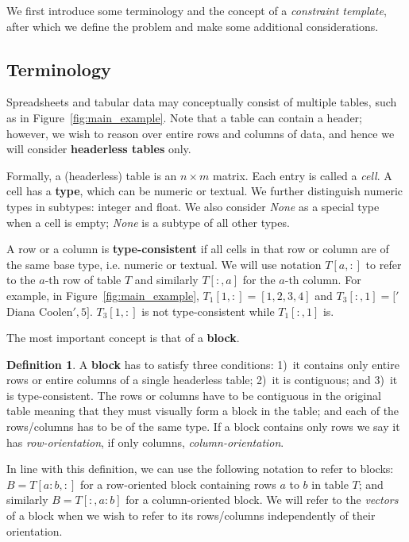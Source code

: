 \documentclass{IEEEtran}
\newcommand{\format}[1]{\textit{#1}\xspace}
\newcommand{\template}{\format{constraint template}}
\newcommand{\rangeto}[2]{#1{:}#2}
\theoremstyle{definition}
\newtheorem{definition}{Definition}
\begin{document}

We first introduce some terminology and the concept of a \template, after which we define the problem and make some additional considerations.

\subsection{Terminology}
Spreadsheets and tabular data may conceptually consist of multiple tables, such as in Figure~\ref{fig:main_example}. Note that a table can contain a header; however, we wish to reason over entire rows and columns of data, and hence we will consider \textbf{headerless tables} only.

Formally, a (headerless) table is an $n \times m$ matrix. Each entry is called a \textit{cell}.
A cell has a {\bf type}, which can be numeric or textual. We further distinguish numeric types in subtypes: integer and float. We also consider \textit{None} as a special type when a cell is empty; \textit{None} is a subtype of all other types.

A row or a column is \textbf{type-consistent} if all cells in that row or column are of the same base type, i.e. numeric or textual.
We will use notation $T[a,{:}]$ to refer to the $a$-th row of table $T$ and similarly $T[{:},a]$ for the $a$-th column.
For example, in Figure~\ref{fig:main_example}, $T_1[1,:] = [1,2,3,4]$ and $T_3[:,1] = ['$Diana Coolen$', 5]$.
$T_3[1, :]$ is not type-consistent while $T_1[:, 1]$ is.

The most important concept is that of a \textbf{block}. 
\begin{definition}
A \textbf{block} has to satisfy three conditions: 1)~it contains only entire rows or entire columns of a single headerless table; 2)~it is contiguous; and 3)~it is type-consistent.
The rows or columns have to be contiguous in the original table meaning that they must visually form a block in the table; and each of the rows/columns has to be of the same type. 
If a block contains only rows we say it has \textit{row-orientation}, if only columns, \textit{column-orientation}. 
\end{definition}

In line with this definition, we can use the following notation to refer to blocks: $B = T[\rangeto{a}{b},:]$ for a row-oriented block containing rows $a$ to $b$ in table $T$; and similarly $B = T[{:},\rangeto{a}{b}]$ for a column-oriented block.
We will refer to the \textit{vectors} of a block when we wish to refer to its rows/columns independently of their orientation.
\end{document}
